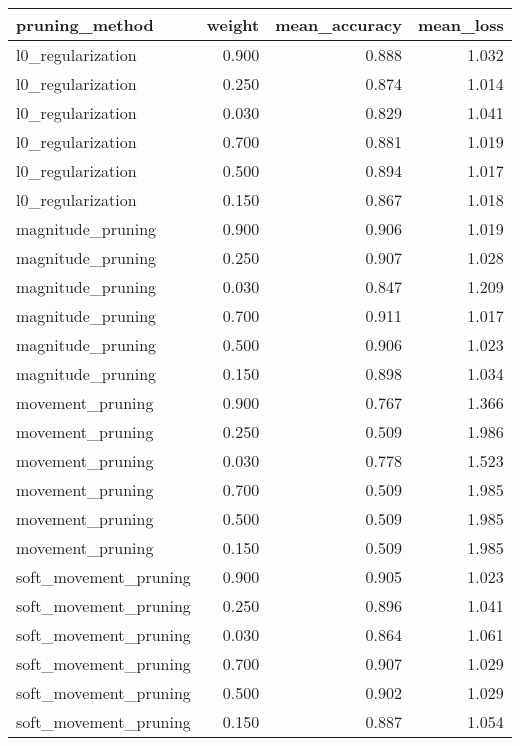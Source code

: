 \begin{tabular}{lrrr}
\toprule
       pruning\_method &  weight &  mean\_accuracy &  mean\_loss \\
\midrule
    l0\_regularization &   0.900 &          0.888 &      1.032 \\
    l0\_regularization &   0.250 &          0.874 &      1.014 \\
    l0\_regularization &   0.030 &          0.829 &      1.041 \\
    l0\_regularization &   0.700 &          0.881 &      1.019 \\
    l0\_regularization &   0.500 &          0.894 &      1.017 \\
    l0\_regularization &   0.150 &          0.867 &      1.018 \\
    magnitude\_pruning &   0.900 &          0.906 &      1.019 \\
    magnitude\_pruning &   0.250 &          0.907 &      1.028 \\
    magnitude\_pruning &   0.030 &          0.847 &      1.209 \\
    magnitude\_pruning &   0.700 &          0.911 &      1.017 \\
    magnitude\_pruning &   0.500 &          0.906 &      1.023 \\
    magnitude\_pruning &   0.150 &          0.898 &      1.034 \\
     movement\_pruning &   0.900 &          0.767 &      1.366 \\
     movement\_pruning &   0.250 &          0.509 &      1.986 \\
     movement\_pruning &   0.030 &          0.778 &      1.523 \\
     movement\_pruning &   0.700 &          0.509 &      1.985 \\
     movement\_pruning &   0.500 &          0.509 &      1.985 \\
     movement\_pruning &   0.150 &          0.509 &      1.985 \\
soft\_movement\_pruning &   0.900 &          0.905 &      1.023 \\
soft\_movement\_pruning &   0.250 &          0.896 &      1.041 \\
soft\_movement\_pruning &   0.030 &          0.864 &      1.061 \\
soft\_movement\_pruning &   0.700 &          0.907 &      1.029 \\
soft\_movement\_pruning &   0.500 &          0.902 &      1.029 \\
soft\_movement\_pruning &   0.150 &          0.887 &      1.054 \\
\bottomrule
\end{tabular}
